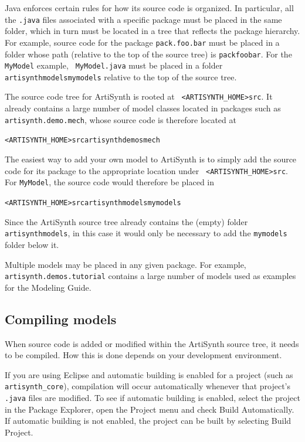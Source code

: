 Java enforces certain rules for how its source code is organized.  In
particular, all the {\tt .java} files associated with a specific
package must be placed in the same folder, which in turn must be located in a
\directory{} tree that reflects the package hierarchy. For
example, source code for the package {\tt pack.foo.bar} must be placed
in a folder whose path (relative to the top of the source tree) is
{\tt pack\SEP foo\SEP bar}.  For the {\tt MyModel} example, {\tt
MyModel.java} must be placed in
a folder {\tt artisynth\SEP models\SEP mymodels} relative to the top
of the source tree.

The source code tree for ArtiSynth is rooted at {\tt
<ARTISYNTH\_HOME>\SEP src}. It already contains a large number of
model classes located in packages such as {\tt
artisynth.demo.mech}, whose source code is therefore located at

{\tt <ARTISYNTH\_HOME>\SEP src\SEP artisynth\SEP demos\SEP mech}

The easiest way to add your own model to ArtiSynth is to simply add
the source code for its package to the appropriate location under {\tt
<ARTISYNTH\_HOME>\SEP src}. For {\tt MyModel}, the source code would
therefore be placed in

{\tt <ARTISYNTH\_HOME>\SEP src\SEP artisynth\SEP models\SEP mymodels}

Since the ArtiSynth source tree already contains the (empty) folder
{\tt artisynth\SEP models}, in this case it would only be necessary to
add the {\tt mymodels} folder below it.

\begin{sideblock}
Multiple models may be placed in any given package. For example, {\tt
artisynth.demos.tutorial} contains a large number of models used as
examples for the Modeling Guide.
\end{sideblock}

\subsection{Compiling models}

When source code is added or modified within the ArtiSynth source
tree, it needs to be compiled. How this is done depends on your
development environment.

If you are using Eclipse and automatic building is enabled for a
project (such as {\tt artisynth\_core}), compilation will occur
automatically whenever that project's {\tt .java} files are
modified. To see if automatic building is enabled, select the project
in the Package Explorer, open the {\sf Project} menu and check {\sf
Build Automatically}. If automatic building is not enabled, the
project can be built by selecting {\sf Build Project}.

